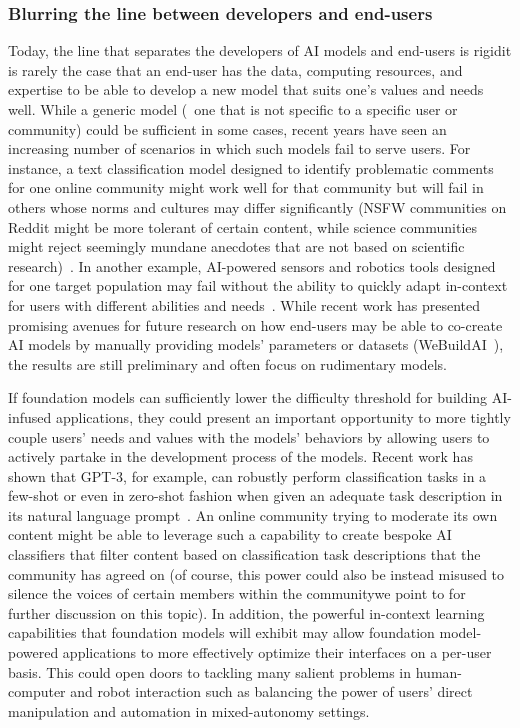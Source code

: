 \subsubsection{Blurring the line between developers and end-users}
\label{sec:interaction-blurring}
Today, the line that separates the developers of AI models and end-users is rigid\dash{}it is rarely the case that an end-user has the data, computing resources, and expertise to be able to develop a new model that suits one's values and needs well. While a generic model (\ie~one that is not specific to a specific user or community) could be sufficient in some cases, recent years have seen an increasing number of scenarios in which such models fail to serve users. For instance, a text classification model designed to identify problematic comments for one online community might work well for that community but will fail in others whose norms and cultures may differ significantly (\eg NSFW communities on Reddit might be more tolerant of certain content, while science communities might reject seemingly mundane anecdotes that are not based on scientific research)~\citep{Chandrasekharan2018internet}. In another example, AI-powered sensors and robotics tools designed for one target population may fail without the ability to quickly adapt in-context for users with different abilities and needs~\citep{Karamcheti2021latent}. While recent work has presented promising avenues for future research on how end-users may be able to co-create AI models by manually providing models' parameters or datasets (\eg WeBuildAI~\citep{Lee2019}), the results are still preliminary and often focus on rudimentary models.

If foundation models can sufficiently lower the difficulty threshold for building AI-infused applications, they could present an important opportunity to more tightly couple users' needs and values with the models' behaviors by allowing users to actively partake in the development process of the models. Recent work has shown that GPT-3, for example, can robustly perform classification tasks in a few-shot or even in zero-shot fashion when given an adequate task description in its natural language prompt~\citep{brown2020gpt3}. An online community trying to moderate its own content might be able to leverage such a capability to create bespoke AI classifiers that filter content based on classification task descriptions that the community has agreed on (of course, this power could also be instead misused to silence the voices of certain members within the community\dash{}we point to  for further discussion on this topic). In addition, the powerful in-context learning capabilities that foundation models will exhibit may allow foundation model-powered applications to more effectively optimize their interfaces on a per-user basis. This could open doors to tackling many salient problems in human-computer and robot interaction such as balancing the power of users' direct manipulation and automation in mixed-autonomy settings. 

